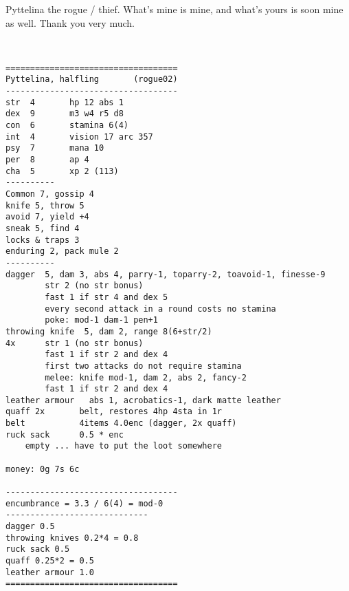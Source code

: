 \clearpage
\begin{samepage}

\noindent Pyttelina the rogue / thief. What's mine is mine, and what's yours is soon mine as well. Thank you very much.

\

\small \begin{verbatim}
===================================
Pyttelina, halfling       (rogue02)
-----------------------------------
str  4       hp 12 abs 1
dex  9       m3 w4 r5 d8
con  6       stamina 6(4)
int  4       vision 17 arc 357
psy  7       mana 10
per  8       ap 4
cha  5       xp 2 (113)
----------
Common 7, gossip 4
knife 5, throw 5
avoid 7, yield +4
sneak 5, find 4
locks & traps 3
enduring 2, pack mule 2
----------
dagger  5, dam 3, abs 4, parry-1, toparry-2, toavoid-1, finesse-9
        str 2 (no str bonus)
        fast 1 if str 4 and dex 5
        every second attack in a round costs no stamina
        poke: mod-1 dam-1 pen+1
throwing knife  5, dam 2, range 8(6+str/2)
4x      str 1 (no str bonus)
        fast 1 if str 2 and dex 4
        first two attacks do not require stamina
        melee: knife mod-1, dam 2, abs 2, fancy-2
        fast 1 if str 2 and dex 4
leather armour   abs 1, acrobatics-1, dark matte leather
quaff 2x       belt, restores 4hp 4sta in 1r
belt           4items 4.0enc (dagger, 2x quaff)
ruck sack      0.5 * enc
    empty ... have to put the loot somewhere

money: 0g 7s 6c

-----------------------------------
encumbrance = 3.3 / 6(4) = mod-0
-----------------------------
dagger 0.5
throwing knives 0.2*4 = 0.8
ruck sack 0.5
quaff 0.25*2 = 0.5
leather armour 1.0
===================================
\end{verbatim} \end{samepage} \normalsize






